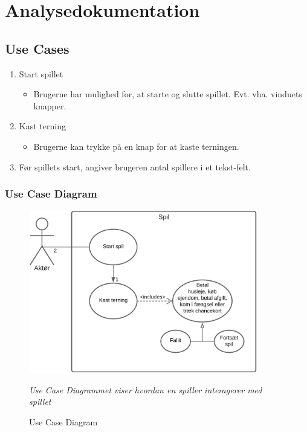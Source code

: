 \section{Analysedokumentation}
    \subsection{Use Cases}
        \begin{enumerate}
          \item Start spillet
        \begin{itemize}
          \item Brugerne har mulighed for, at starte og slutte spillet. Evt. vha. vinduets knapper.
        \end{itemize}
         \item Kast terning
        \begin{itemize}
           \item Brugerne kan trykke på en knap for at kaste terningen.
        \end{itemize}
         \item Før spillets start, angiver brugeren antal spillere i et tekst-felt.
        \end{enumerate}
        
        
        \subsubsection{Use Case Diagram}
        
        \begin{figure}[H]
            \centering
            \includegraphics[width=10cm]{figures/usecase.jpg}
            \caption{Use Case Diagram}
            \emph{ Use Case Diagrammet viser hvordan en spiller interagerer med spillet}
        \end{figure}

